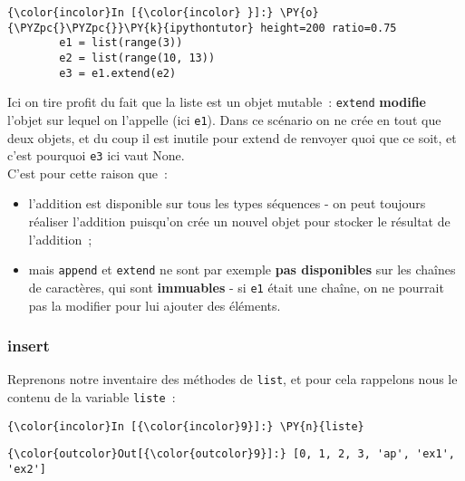     \begin{Verbatim}[commandchars=\\\{\}]
{\color{incolor}In [{\color{incolor} }]:} \PY{o}{\PYZpc{}\PYZpc{}}\PY{k}{ipythontutor} height=200 ratio=0.75
        e1 = list(range(3))
        e2 = list(range(10, 13))
        e3 = e1.extend(e2)
\end{Verbatim}


    Ici on tire profit du fait que la liste est un objet mutable~:
\texttt{extend} \textbf{modifie} l'objet sur lequel on l'appelle (ici
\texttt{e1}). Dans ce scénario on ne crée en tout que deux objets, et du
coup il est inutile pour extend de renvoyer quoi que ce soit, et c'est
pourquoi \texttt{e3} ici vaut None.\\

    C'est pour cette raison que~:

\begin{itemize}
\tightlist
\item
  l'addition est disponible sur tous les types séquences - on peut
  toujours réaliser l'addition puisqu'on crée un nouvel objet pour
  stocker le résultat de l'addition~;
\item
  mais \texttt{append} et \texttt{extend} ne sont par exemple
  \textbf{pas disponibles} sur les chaînes de caractères, qui sont
  \textbf{immuables} - si \texttt{e1} était une chaîne, on ne pourrait
  pas la modifier pour lui ajouter des éléments.
\end{itemize}

    \hypertarget{insert}{%
\subsubsection{\texorpdfstring{\textbf{insert}}{insert}}\label{insert}}

    Reprenons notre inventaire des méthodes de \texttt{list}, et pour cela
rappelons nous le contenu de la variable \texttt{liste}~:

    \begin{Verbatim}[commandchars=\\\{\}]
{\color{incolor}In [{\color{incolor}9}]:} \PY{n}{liste}
\end{Verbatim}


\begin{Verbatim}[commandchars=\\\{\}]
{\color{outcolor}Out[{\color{outcolor}9}]:} [0, 1, 2, 3, 'ap', 'ex1', 'ex2']
\end{Verbatim}
            
